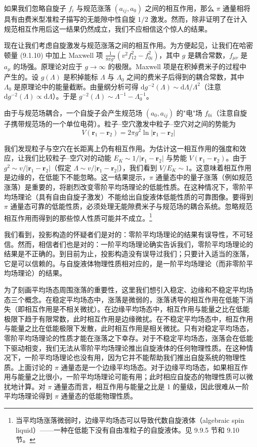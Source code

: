 如果我们忽略自旋子 $f_i$ 与规范涨落 $(a_{ij},a_0)$ 之间的相互作用，那么 $\pi$ 通量相将具有由费米型准粒子描写的无能隙中性自旋 $1/2$ 激发。然而，除非证明了在计入规范相互作用后这一结果仍然成立，我们不应相信这个惊人的结果。

现在让我们考虑自旋激发与规范涨落之间的相互作用。为方便起见，让我们在哈密顿量 (9.1.10) 中加上 Maxwell 项 $\frac{1}{8\pi g^{2}}(v^{2}f_{12}^{2}-f_{0i}^{2})$，其中 $g$ 是耦合常数，$f_{\mu\nu}$ 是 $a_{\mu}$ 的场强。原理论对应于 $g\to\infty$ 的极限。Maxwell 项是在积掉费米子的过程中产生的。设 $g(\Lambda)$ 是积掉能标 $\Lambda$ 与 $\Lambda_0$ 之间的费米子后得到的耦合常数，其中 $\Lambda_0$ 是原理论中的能量截断。由量纲分析可得 $\mathrm{d}g^{-2}(\Lambda)\sim\mathrm{d}\Lambda/\Lambda^{2}$（注意 $\mathrm{d}g^{-2}(\Lambda)\propto\mathrm{d}\Lambda$）。于是 $g^{-2}(\Lambda)\sim\Lambda^{-1}-\Lambda_0^{-1}$。

由于与规范场耦合，一个自旋子会产生规范场 $(a_0,a_{ij})$ 的"电"场 $f_{0i}$（注意自旋子携带规范场的一个单位电荷）。粒子–空穴激发中粒子–空穴对之间的势能为
\begin{equation*}
V(\pmb{r}_1-\pmb{r}_2)=2\pi g^{2}\ln|\pmb{r}_1-\pmb{r}_2|
\tag{9.1.20}
\end{equation*}

我们发现粒子与空穴在长距离上仍有相互作用。为估计这一相互作用的强度和效应，让我们比较粒子–空穴对的动能 $E_K\sim 1/|\pmb{r}_1-\pmb{r}_2|$ 与势能 $V(\pmb{r}_1-\pmb{r}_2)$。由于 $g^{2}\sim v/|\pmb{r}_1-\pmb{r}_2|$（假定 $\Lambda\sim v/|\pmb{r}_1-\pmb{r}_2|$），我们看到 $V/E_K\sim 1$。这意味着相互作用是边缘的，在低能下不能忽略。这一结果提示，$\pi$ 通量态中的量子涨落（例如规范涨落）是重要的，将剧烈改变零阶平均场理论的低能性质。在这种情况下，零阶平均场理论（具有自由自旋子激发）不能给出自旋液体低能性质的可靠图像。要得到 $\pi$ 通量态可靠的低能性质，必须处理无能隙费米子与规范场的耦合系统。忽略规范相互作用而得到的那些惊人性质可能并不成立。\footnote{当平均场涨落微弱时，边缘平均场态可以导致代数自旋液体（algebraic spin liquid）——一种在低能下没有自由准粒子的自旋液体。见 9.9.5 节和 9.10 节。}

我们看到，投影构造的怀疑者们是对的：零阶平均场理论的结果有误导性，不可轻信。然而，相信者们也是对的：一阶平均场理论确实告诉我们，零阶平均场理论的结果是不正确的。到目前为止，投影构造没有误导过我们；只要计入适当的涨落，它是可以信赖的。与自旋液体物理性质相对应的，是一阶平均场理论（而非零阶平均场理论）的结果。

为了刻画平均场态周围涨落的重要性，这里我们想引入稳定、边缘和不稳定平均场态三个概念。在稳定平均场态中，涨落是微弱的，涨落诱导的相互作用在低能下消失（即相互作用是不相关微扰）。在边缘平均场态中，相互作用与能量之比在低能极限下趋于有限常数，此时相互作用是边缘微扰。在不稳定平均场态中，相互作用与能量之比在低能极限下发散，此时相互作用是相关微扰。只有对稳定平均场态，零阶平均场理论的性质才能在涨落之下幸存。对于不稳定平均场态，涨落会在低能下驱动相变，我们无法从零阶平均场理论推出自旋液体的任何物理性质。在这种情况下，一阶平均场理论也没有用，因为它并不能帮助我们推出自旋系统的物理性质。上面讨论的 $\pi$ 通量态是一个边缘平均场态。对于边缘平均场态，如果相互作用与能量之比很小，一阶平均场理论可能有用；此时相应自旋态的物理性质可以微扰地计算。对 $\pi$ 通量态而言，相互作用与能量之比是 1 的量级，因此很难从一阶平均场理论得到 $\pi$ 通量态的低能物理性质。

